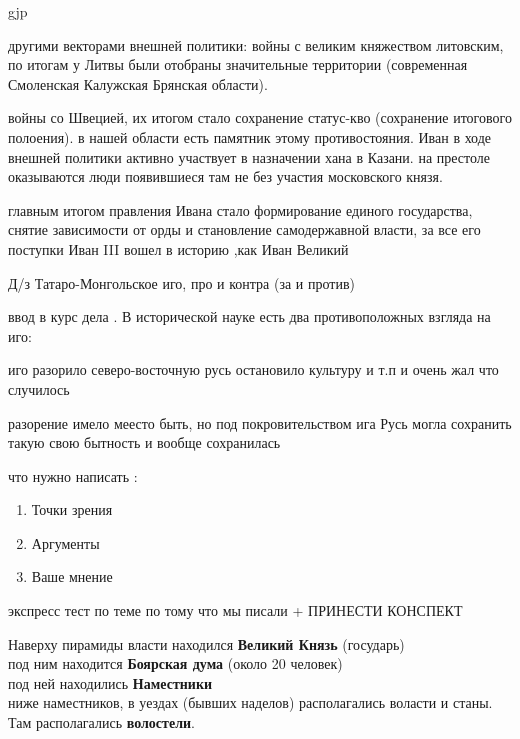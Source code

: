 gjp	 \documentclass[12pt,a4paper]{article}
\begin{document}
\begin{enumerate}
другими векторами внешней политики: войны с великим княжеством литовским,  по итогам у Литвы были отобраны значительные территории (современная Смоленская Калужская Брянская области). 

войны со Швецией,  их итогом стало сохранение статус-кво (сохранение итогового полоения). в нашей области есть памятник этому противостояния. Иван в ходе внешней политики активно участвует в назначении хана в Казани.  на престоле оказываются люди появившиеся там не без участия московского князя.  

главным итогом правления Ивана стало формирование единого государства, снятие зависимости от орды и становление самодержавной власти, за все его поступки Иван III вошел в историю ,как Иван Великий
\end{enumerate}


\begin{Huge}
Д/з Татаро-Монгольское иго, про и контра (за и против)

ввод в курс дела .  В исторической науке есть два противоположных взгляда на иго:

иго разорило северо-восточную русь остановило культуру и т.п и очень жал что случилось

разорение имело меесто быть, но под покровительством ига Русь могла сохранить такую свою бытность и вообще сохранилась


что нужно написать :
\begin{enumerate}
	\item	Точки зрения
	\item	Аргументы
	\item	Ваше мнение
\end{enumerate}

экспресс тест по теме по тому что мы писали + ПРИНЕСТИ КОНСПЕКТ 
\end{Huge}

Наверху пирамиды власти находился\textbf{ Великий Князь} (государь)\\
под ним находится \textbf{Боярская дума} (около 20 человек)\\
под ней находились \textbf{Наместники}\\
ниже наместников, в уездах (бывших наделов) располагались воласти и станы. Там располагались \textbf{волостели}.\\
\end{document}
